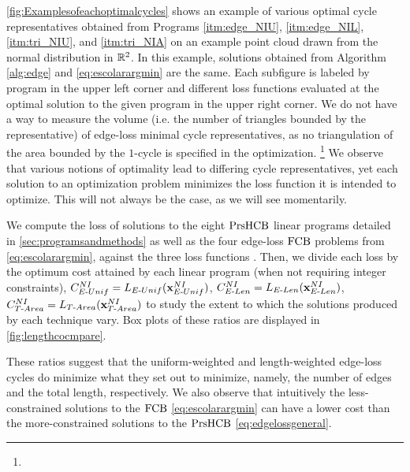 \fig \ref{fig:Examplesofeachoptimalcycles} shows an example of various optimal cycle representatives obtained from Programs
\ref{itm:edge_NIU},
\ref{itm:edge_NIL},
\ref{itm:tri_NIU}, and
\ref{itm:tri_NIA}
on an example point cloud drawn from the normal distribution in $\mathbb{R}^2$. In this example, solutions obtained from Algorithm \ref{alg:edge} and \pr \eqref{eq:escolarargmin} are the same. Each subfigure is labeled by program in the upper left corner and different loss functions evaluated at the optimal solution to the given program in the upper right corner. We do not have a way to measure the volume (i.e. the number of triangles bounded by the representative) of edge-loss minimal cycle representatives, as no triangulation of the area bounded by the $1$-cycle is specified in the optimization. \DIFaddbegin \footnote{} \DIFaddend We observe that various notions of optimality lead to differing cycle representatives, yet each solution to an optimization problem minimizes the loss function it is intended to optimize. This will not always be the case, as we will see momentarily.

We compute the loss of solutions to the eight $\mathrm{PrsHCB}$ linear programs detailed in \se \ref{sec:programsandmethods} as well as the four edge-loss $\mathrm{FCB}$ problems from \pr \eqref{eq:escolarargmin}, against the three loss functions \DIFaddbegin {}\DIFaddend . Then, we divide each loss by the optimum cost attained by each linear program (when not requiring integer constraints), $C_{E\text{-}Unif}^{NI}=L_{E\text{-}Unif}(\mathbf{x}_{E\text{-}Unif}^{NI})$, $C_{E\text{-}Len}^{NI}=L_{E\text{-}Len}(\mathbf{x}_{E\text{-}Len}^{NI})$, $C_{T\text{-}Area}^{NI}=L_{T\text{-}Area}(\mathbf{x}_{T\text{-}Area}^{NI})$ to study the extent to which the solutions produced by each technique vary.   
Box plots of these ratios are displayed in \fig\ref{fig:lengthcocmpare}. 




These ratios suggest that the uniform-weighted and length-weighted edge-loss cycles do minimize what they set out to minimize, namely, the number of edges and the total length, respectively. We also observe that intuitively the less-constrained solutions to the $\mathrm{FCB}$ \pr \eqref{eq:escolarargmin} can have a lower cost than the more-constrained solutions to the $\mathrm{PrsHCB}$ \pr \eqref{eq:edgelossgeneral}. 


